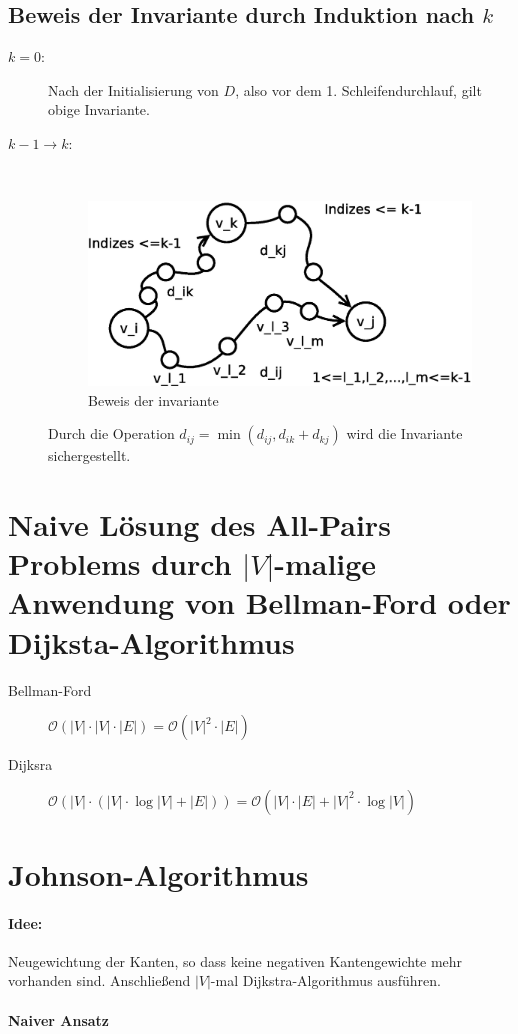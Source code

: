 \subsection{Beweis der Invariante durch Induktion nach $k$}
\begin{description}
\item[$k=0$:] Nach der Initialisierung von $D$, also vor dem 1. Schleifendurchlauf, gilt obige Invariante.
\item[$k-1\rightarrow k$:]$~$\\
\begin{figure}[H]
\centering
\includegraphics[width=0.5\linewidth]{18/Grafik/Diagramm2}
\caption{Beweis der invariante}
\label{fig:Diagramm2}
\end{figure}
Durch die Operation $d_{ij} = \min(d_{ij}, d_{ik}+d_{kj})$ wird die Invariante sichergestellt.
\end{description}
\section[Naive lösung]{Naive Lösung des All-Pairs Problems durch $|V|$-malige Anwendung von Bellman-Ford oder Dijksta-Algorithmus}
\begin{description}
\item[Bellman-Ford] $\mathcal{O}(|V|\cdot|V|\cdot|E|) = \mathcal{O}(|V|^2\cdot|E|)$
\item[Dijksra] $\mathcal{O}(|V|\cdot(|V|\cdot\log|V|+|E|)) = \mathcal{O}(|V|\cdot|E|+|V|^2\cdot\log|V|)$
\end{description}
\section{Johnson-Algorithmus}
\paragraph{Idee:} Neugewichtung der Kanten, so dass keine negativen Kantengewichte mehr vorhanden sind. Anschließend $|V|$-mal Dijkstra-Algorithmus ausführen.

\paragraph{Naiver Ansatz}$~~$\\

